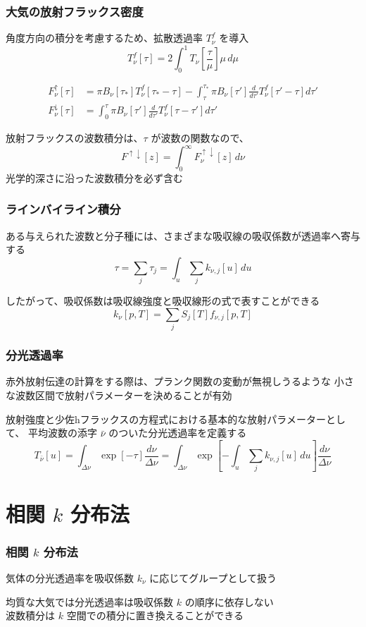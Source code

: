 \documentclass[unicode,colorlinks]{beamer}
\begin{document}
\begin{frame}
	\frametitle{大気の放射フラックス密度}
	角度方向の積分を考慮するため、拡散透過率 $T^f_\nu$ を導入
	\[T^f_\nu[\tau]=2\int^1_0 T_\nu\left[\frac{\tau}{\mu}\right]\mu\,d\mu\]

	\begin{align*}
		F^\uparrow_\nu[\tau]
			&=\pi B_\nu[\tau_*]T^f_\nu[\tau_*-\tau]
			-\int^{\tau_*}_\tau \pi B_\nu[\tau']\frac{d}{d\tau'}T^f_\nu[\tau'-\tau]d\tau'\\
		F^\downarrow_\nu[\tau]
			&=\int^\tau_0 \pi B_\nu[\tau']\frac{d}{d\tau'}T^f_\nu[\tau-\tau']d\tau'
	\end{align*}

	放射フラックスの波数積分は、$\tau$ が波数の関数なので、
	\[F^{\uparrow\downarrow}[z]=\int^\infty_0 F^{\uparrow\downarrow}_\nu[z]\,d\nu\]
	光学的深さに沿った波数積分を必ず含む
\end{frame}

\begin{frame}
	\frametitle{ラインバイライン積分}
	ある与えられた波数と分子種には、さまざまな吸収線の吸収係数が透過率へ寄与する
	\[\tau=\sum_j \tau_j=\int_u\sum_j k_{\nu,j}[u]\,du\]

	したがって、吸収係数は吸収線強度と吸収線形の式で表すことができる
	\[k_\nu[p,T]=\sum_j S_j[T]f_{\nu,j}[p,T]\]
\end{frame}

\begin{frame}
	\frametitle{分光透過率}
	赤外放射伝達の計算をする際は、プランク関数の変動が無視しうるような
	小さな波数区間で放射パラメーターを決めることが有効

	放射強度と少佐hフラックスの方程式における基本的な放射パラメーターとして、
	平均波数の添字 $\bar\nu$ のついた分光透過率を定義する
	\[
		T_{\bar\nu}[u]
		=\int_{\Delta\nu}\exp[-\tau]\frac{d\nu}{\Delta\nu}
		=\int_{\Delta\nu}\exp\left[-\int_u\sum_j k_{\nu,j}[u]\,du\right]\frac{d\nu}{\Delta\nu}
	\]
\end{frame}

\section{相関 $k$ 分布法}

\begin{frame}
	\frametitle{相関 $k$ 分布法}
	気体の分光透過率を吸収係数 $k_\nu$ に応じてグループとして扱う

	均質な大気では分光透過率は吸収係数 $k$ の順序に依存しない\\
	波数積分は $k$ 空間での積分に置き換えることができる
\end{frame}
\end{document}
